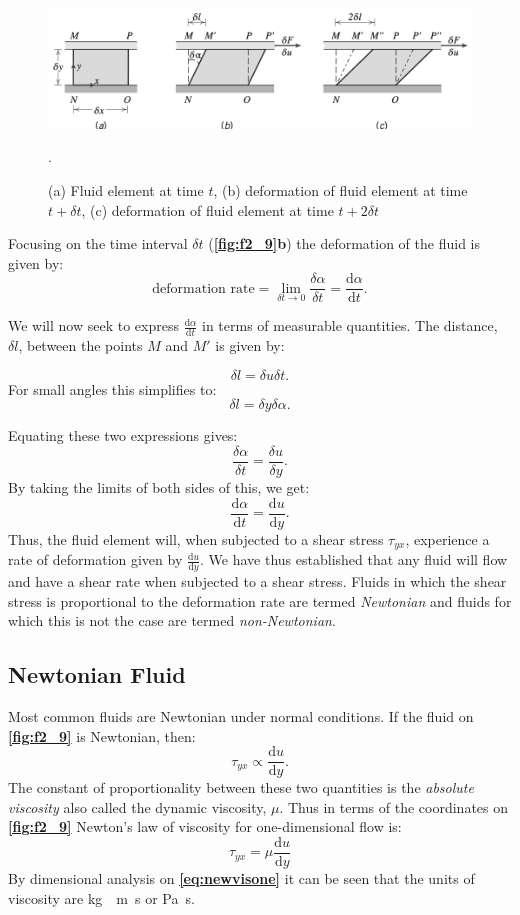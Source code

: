 \begin{figure} [ht]
  \centering
  \includegraphics[width=0.5\linewidth]{./figures/f2_9.png}
  \caption{(a) Fluid element at time $t$, (b) deformation of fluid element at time $t + \delta t$, (c) deformation of fluid element at time $t + 2\delta t$}.
  \label{fig:f2_9}
\end{figure}

Focusing on the time interval $\delta t$ (\textbf{\autoref{fig:f2_9}b}) the deformation of the fluid is given by:
\[ 
\text{deformation rate} = \lim_{\delta t \to 0} \frac{\delta \alpha}{\delta t} = \frac{\mathrm{d} \alpha}{\mathrm{d}t} 
.\]

We will now seek to express $\frac{\mathrm{d}\alpha}{\mathrm{d}t} $ in terms of measurable quantities. The distance, $\delta l$, between the points $M$ and $M'$ is given by:

\[ 
\delta l = \delta u \delta t
.\]
For small angles this simplifies to:
\[ 
\delta l = \delta y \delta \alpha
.\]

Equating these two expressions gives:
\[ 
\frac{\delta \alpha}{\delta t} = \frac{\delta u}{\delta y}
.\]
By taking the limits of both sides of this, we get:
\[ 
\frac{\mathrm{d}\alpha}{\mathrm{d}t} = \frac{\mathrm{d}u}{\mathrm{d}y} 
.\]
Thus, the fluid element will, when subjected to a shear stress $\tau_{yx}$, experience a rate of deformation given by $\frac{\mathrm{d}u}{\mathrm{d}y} $. We have thus established that any fluid will flow and have a shear rate when subjected to a shear stress. Fluids in which the shear stress is proportional to the deformation rate are termed \textit{Newtonian} and fluids for which this is not the case are termed \textit{non-Newtonian}.

\subsection{Newtonian Fluid}
Most common fluids are Newtonian under normal conditions. If the fluid on \textbf{\autoref{fig:f2_9}} is Newtonian, then:
\[ 
\tau_{yx} \propto \frac{\mathrm{d}u}{\mathrm{d}y} 
.\]
The constant of proportionality between these two quantities is the \textit{absolute viscosity} also called the dynamic viscosity, $\mu$. Thus in terms of the coordinates on \textbf{\autoref{fig:f2_9}} Newton's law of viscosity for one-dimensional flow is:
\begin{equation} \label{eq:newvisone}
  \tau_{yx} = \mu \frac{\mathrm{d}u}{\mathrm{d}y} 
\end{equation}
By dimensional analysis on \textbf{\autoref{eq:newvisone}} it can be seen that the units of viscosity are \unit{kg.\per.m.s} or \unit{Pa.s}.


